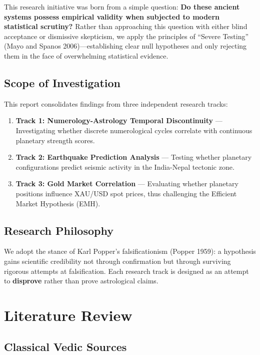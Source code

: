 \documentclass[
  11pt,
  a4paper,
  oneside,
  openany]{article}
\begin{document}
This research initiative was born from a simple question: \textbf{Do
these ancient systems possess empirical validity when subjected to
modern statistical scrutiny?} Rather than approaching this question with
either blind acceptance or dismissive skepticism, we apply the
principles of ``Severe Testing'' (Mayo and Spanos 2006)---establishing
clear null hypotheses and only rejecting them in the face of
overwhelming statistical evidence.

\subsection{Scope of Investigation}\label{scope-of-investigation}

This report consolidates findings from three independent research
tracks:

\begin{enumerate}
\def\labelenumi{\arabic{enumi}.}
\item
  \textbf{Track 1: Numerology-Astrology Temporal Discontinuity} ---
  Investigating whether discrete numerological cycles correlate with
  continuous planetary strength scores.
\item
  \textbf{Track 2: Earthquake Prediction Analysis} --- Testing whether
  planetary configurations predict seismic activity in the India-Nepal
  tectonic zone.
\item
  \textbf{Track 3: Gold Market Correlation} --- Evaluating whether
  planetary positions influence XAU/USD spot prices, thus challenging
  the Efficient Market Hypothesis (EMH).
\end{enumerate}

\subsection{Research Philosophy}\label{research-philosophy}

We adopt the stance of Karl Popper's falsificationism (Popper 1959): a
hypothesis gains scientific credibility not through confirmation but
through surviving rigorous attempts at falsification. Each research
track is designed as an attempt to \textbf{disprove} rather than prove
astrological claims.

\section{Literature Review}\label{literature-review}

\subsection{Classical Vedic Sources}\label{classical-vedic-sources}
\end{document}
